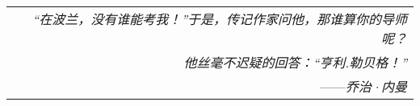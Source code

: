 \begin{flushright}
    \begin{tabular}{r|||}
        \textit{“在波兰，没有谁能考我！”于是，传记作家问他，那谁算你的导师呢？}\\
        \textit{他丝毫不迟疑的回答：“亨利.勒贝格！”}\\
        ——\textit{乔治·内曼}
    \end{tabular}
\end{flushright}

